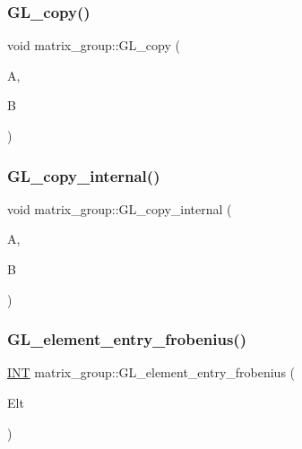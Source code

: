 \mbox{\label{classmatrix__group_a8f9275241e3b702fa045cadf9a5dcd72}} 
\subsubsection{\texorpdfstring{G\+L\+\_\+copy()}{GL\_copy()}}
{\footnotesize\ttfamily void matrix\+\_\+group\+::\+G\+L\+\_\+copy (\begin{DoxyParamCaption}\item[{\mbox{\hyperlink{galois_8h_a09fddde158a3a20bd2dcadb609de11dc}{I\+NT}} $\ast$}]{A,  }\item[{\mbox{\hyperlink{galois_8h_a09fddde158a3a20bd2dcadb609de11dc}{I\+NT}} $\ast$}]{B }\end{DoxyParamCaption})}

\mbox{\label{classmatrix__group_a5d825e5ab65bf6c3bfcb32061c5f9fd5}} 
\subsubsection{\texorpdfstring{G\+L\+\_\+copy\+\_\+internal()}{GL\_copy\_internal()}}
{\footnotesize\ttfamily void matrix\+\_\+group\+::\+G\+L\+\_\+copy\+\_\+internal (\begin{DoxyParamCaption}\item[{\mbox{\hyperlink{galois_8h_a09fddde158a3a20bd2dcadb609de11dc}{I\+NT}} $\ast$}]{A,  }\item[{\mbox{\hyperlink{galois_8h_a09fddde158a3a20bd2dcadb609de11dc}{I\+NT}} $\ast$}]{B }\end{DoxyParamCaption})}

\mbox{\label{classmatrix__group_a8eb2cc69bdfd4b6daa92a7a881f680fc}} 
\subsubsection{\texorpdfstring{G\+L\+\_\+element\+\_\+entry\+\_\+frobenius()}{GL\_element\_entry\_frobenius()}}
{\footnotesize\ttfamily \mbox{\hyperlink{galois_8h_a09fddde158a3a20bd2dcadb609de11dc}{I\+NT}} matrix\+\_\+group\+::\+G\+L\+\_\+element\+\_\+entry\+\_\+frobenius (\begin{DoxyParamCaption}\item[{\mbox{\hyperlink{galois_8h_a09fddde158a3a20bd2dcadb609de11dc}{I\+NT}} $\ast$}]{Elt }\end{DoxyParamCaption})}

